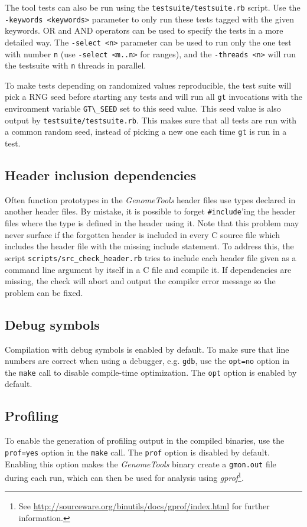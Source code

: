 \documentclass[11pt,final]{article}
\newcommand{\keyword}[1]{\lstinline{#1}}
\newcommand{\Gt}[0]{\emph{GenomeTools}\xspace}
\begin{document}
The tool tests can also be run using the \keyword{testsuite/testsuite.rb}
script. Use the \keyword{-keywords <keywords>} parameter to only run these
tests tagged with the given keywords. OR and AND operators can be used to
specify the tests in a more detailed way. The \keyword{-select <n>} parameter
can be used to run only the one test with number \keyword{n} (use
\keyword{-select <m..n>} for ranges), and the \keyword{-threads <n>} will run
the testsuite with \keyword{n} threads in parallel.

To make tests depending on randomized values reproducible, the test suite will
pick a RNG seed before starting any tests and will run all \keyword{gt}
invocations with the environment variable \keyword{GT\_SEED} set to this seed
value. This seed value is also output by \keyword{testsuite/testsuite.rb}. This
makes sure that all tests are run with a common random seed, instead of picking
a new one each time \keyword{gt} is run in a test.

\subsection{Header inclusion dependencies}
Often function prototypes in the \Gt header files use types declared in
another header files. By mistake, it is possible to forget
\keyword{#include}'ing the header files where the type is defined in the header
using it. Note that this problem may never surface if the forgotten header
is included in every C source file which includes the header file with the
missing include statement. To address this, the script
\keyword{scripts/src_check_header.rb} tries to include each header file given
as a command line argument by itself in a C file and compile it.
If dependencies are missing, the check will abort and output the compiler error
message so the problem can be fixed.

\subsection{Debug symbols}
Compilation with debug symbols is enabled by default.
To make sure that line numbers are correct when using a debugger, e.g.
\keyword{gdb}, use the \keyword{opt=no} option in the \keyword{make} call to
disable compile-time optimization. The \keyword{opt} option is enabled by
default.

\subsection{Profiling}
To enable the generation of profiling output in the compiled binaries, use the
\keyword{prof=yes} option in the \keyword{make} call. The \keyword{prof} option
is disabled by default. Enabling this option makes the \Gt binary create a
\keyword{gmon.out} file during each run, which can then be used for analysis
using \emph{gprof}\footnote{See
\url{http://sourceware.org/binutils/docs/gprof/index.html} for further
information.}.
\end{document}
